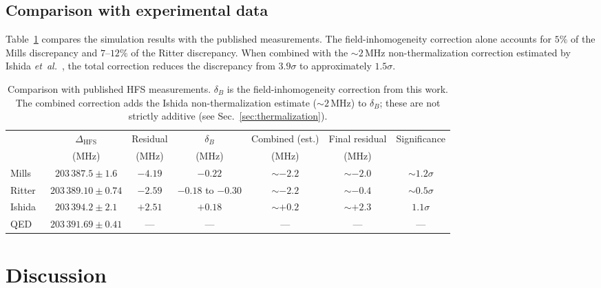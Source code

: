 \documentclass[twocolumn,pra,aps,superscriptaddress,floatfix,10pt]{revtex4-2}
\begin{document}
\subsection{Comparison with experimental data}
\label{sec:comparison}

Table~\ref{tab:comparison} compares the simulation results with the published measurements. The field-inhomogeneity correction alone accounts for $5\%$ of the Mills discrepancy and $7$--$12\%$ of the Ritter discrepancy. When combined with the $\sim 2$\,MHz non-thermalization correction estimated by Ishida \textit{et~al.}~\cite{Ishida2014}, the total correction reduces the discrepancy from $3.9\sigma$ to approximately $1.5\sigma$.

\begin{table}[t]
\caption{Comparison with published HFS measurements. $\delta_B$ is the field-inhomogeneity correction from this work. The combined correction adds the Ishida non-thermalization estimate ($\sim 2$\,MHz) to $\delta_B$; these are not strictly additive (see Sec.~\ref{sec:thermalization}).}
\label{tab:comparison}
\begin{ruledtabular}
\begin{tabular}{lcccccc}
 & $\Delta_\mathrm{HFS}$ & Residual & $\delta_B$ & Combined (est.) & Final residual & Significance \\
 & (MHz) & (MHz) & (MHz) & (MHz) & (MHz) & \\
\hline
Mills~\cite{Mills1983}  & $203\,387.5 \pm 1.6$ & $-4.19$ & $-0.22$ & $\sim -2.2$ & $\sim -2.0$ & $\sim 1.2\sigma$ \\
Ritter~\cite{Ritter1984} & $203\,389.10 \pm 0.74$ & $-2.59$ & $-0.18$ to $-0.30$ & $\sim -2.2$ & $\sim -0.4$ & $\sim 0.5\sigma$ \\
Ishida~\cite{Ishida2014} & $203\,394.2 \pm 2.1$ & $+2.51$ & $+0.18$ & $\sim +0.2$ & $\sim +2.3$ & $1.1\sigma$ \\
QED~\cite{Kniehl2000,Baker2014} & $203\,391.69 \pm 0.41$ & --- & --- & --- & --- & --- \\
\end{tabular}
\end{ruledtabular}
\end{table}

\section{Discussion}
\label{sec:discussion}
\end{document}
